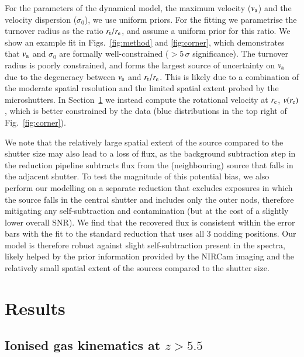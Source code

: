 \documentclass[longauth]{aa}
\newcommand{\re}{r_{\rm e}}
\newcommand{\rt}{r_{\rm t}}
\newcommand{\va}{v_{\rm a}}
\newcommand{\vdisp}{\sigma_0}
\begin{document}
For the parameters of the dynamical model, the maximum velocity ($\va$) and the velocity dispersion ($\vdisp$), we use uniform priors. For the fitting we parametrise the turnover radius as the ratio $r_{\rm t}/\re$, and assume a uniform prior for this ratio. We show an example fit in Figs.~\ref{fig:method} and \ref{fig:corner}, which demonstrates that $\va$ and $\vdisp$ are formally well-constrained ($>5\,\sigma$ significance). The turnover radius is poorly constrained, and forms the largest source of uncertainty on $\va$ due to the degeneracy between $\va$ and $\rt/\re$. This is likely due to a combination of the moderate spatial resolution and the limited spatial extent probed by the microshutters. In Section~\ref{sec:results} we instead compute the rotational velocity at $\re$, $v(\re)$, which is better constrained by the data (blue distributions in the top right of Fig.~\ref{fig:corner}).


We note that the relatively large spatial extent of the source compared to the shutter size may also lead to a loss of flux, as the background subtraction step in the reduction pipeline subtracts flux from the (neighbouring) source that falls in the adjacent shutter. To test the magnitude of this potential bias, we also perform our modelling on a separate reduction that excludes exposures in which the source falls in the central shutter and includes only the outer nods, therefore mitigating any self-subtraction and contamination (but at the cost of a slightly lower overall SNR). We find that the recovered flux is consistent within the error bars with the fit to the standard reduction that uses all 3 nodding positions. Our model is therefore robust against slight self-subtraction present in the spectra, likely helped by the prior information provided by the NIRCam imaging and the relatively small spatial extent of the sources compared to the shutter size.





\section{Results} \label{sec:results}

\subsection{Ionised gas kinematics at $z>5.5$}\label{sec:results_vsigma}
\end{document}
